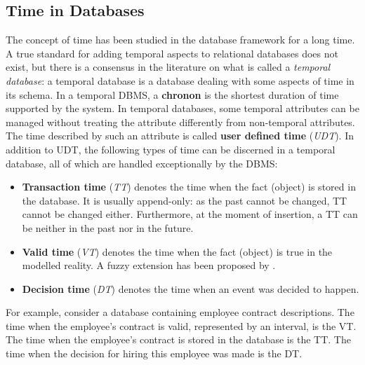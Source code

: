 %
%
\subsection{\label{subsec:time-in-databases}Time in Databases}
The concept of time has been studied in the database framework for a long time. A true standard for adding temporal aspects to relational databases does not exist, but there is a consensus in the literature \cite{Dyreson1994} on what is called a \emph{temporal database}: a temporal database is a database dealing with some aspects of time in its schema.
In a temporal DBMS, a \textbf{chronon} is the shortest duration of time supported by the system. In temporal databases, some temporal attributes can be managed without treating the attribute differently from non-temporal attributes. The time described by such an attribute is called \textbf{user defined time} (\emph{UDT}). In addition to UDT, the following types of time can be discerned in a temporal database, all of which are handled exceptionally by the DBMS:

\begin{itemize}
	\item
	\textbf{Transaction time} (\emph{TT}) \cite{Rowe1987,Jensen1991} denotes the time when the fact (object) is stored in the database. It is usually append-only: as the past cannot be changed, TT cannot be changed either. Furthermore, at the moment of insertion, a TT can be neither in the past nor in the future.
	\item
	\textbf{Valid time} (\emph{VT}) \cite{Jensen1994,Sarda1990,McKenzie1981} denotes the time when the fact (object) is true in the modelled reality. A fuzzy extension has been proposed by \cite{Garrido2009}. 
	\item
	\textbf{Decision time} (\emph{DT}) \cite{Nascimento1995,Chakravarthy1994,Etzion1992,Ozsoyoglu1995} denotes the time when an event was decided to happen. 
	\end{itemize}
	 
	For example, consider a database containing employee contract descriptions. The time when the employee's contract is valid, represented by an interval, is the VT. The time when the employee's contract is stored in the database is the TT. The time when the decision for hiring this employee was made is the DT.

